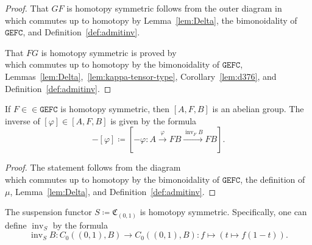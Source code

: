\documentclass[10pt]{simplearticle}
\newcommand{\tikzinput}[1]{}
\newcommand{\GEFC}{\mathbb{\mathtt{GEFC}}}
\newcommand{\C}{\mathfrak{C}^{\,}}
\newcommand{\inv}{\operatorname{inv}}
\begin{document}
\begin{proof}
That $GF$ is homotopy symmetric follows from the outer diagram in
\[
\tikzinput{d374}
\]
which commutes up to homotopy by Lemma~\ref{lem:Delta}, the bimonoidality
of $\GEFC$, and Definition~\ref{def:admitinv}.

That $FG$ is homotopy symmetric is proved by
\[
\tikzinput{d375}
\]
which commutes up to homotopy by the bimonoidality of $\GEFC$, Lemmas~\ref{lem:Delta},~\ref{lem:kappa-tensor-type},
Corollary~\ref{lem:d376}, and Definition~\ref{def:admitinv}.
\end{proof}

\begin{thm}
If $F\in\in\GEFC$ is homotopy symmetric, then $[A,F,B]$ is an abelian
group. The inverse of $[\varphi]\in[A,F,B]$ is given by the formula
\[
-[\varphi]\coloneqq[-\varphi\colon A\xrightarrow{\varphi}FB\xrightarrow{\inv_{F}B}FB].
\]
\end{thm}

\begin{proof}
The statement follows from the diagram
\[
\tikzinput{d480}
\]
which commutes up to homotopy by the bimonoidality of $\GEFC$, the
definition of $\mu$, Lemma~\ref{lem:Delta}, and Definition~\ref{def:admitinv}.
\end{proof}

\begin{prop}
The suspension functor $S\coloneqq\C_{(0,1)}$ is homotopy symmetric.
Specifically, one can define $\inv_{S}$ by the formula
\[
\inv_{S}B\colon C_{0}((0,1),B)\to C_{0}((0,1),B)\colon f\mapsto(t\mapsto f(1-t)).
\]
\end{prop}
\end{document}
